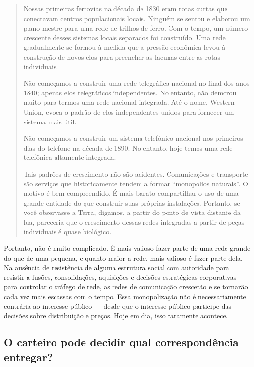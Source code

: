 \begin{quote}
Nossas primeiras ferrovias na década de 1830 eram rotas curtas que conectavam centros
populacionais locais. Ninguém se sentou e elaborou um plano mestre para uma rede de trilhos
de ferro. Com o tempo, um número crescente desses sistemas locais separados foi construído.
Uma rede gradualmente se formou à medida que a pressão econômica levou à construção de novos
elos para preencher as lacunas entre as rotas individuais.

Não começamos a construir uma rede telegráfica nacional no final dos anos 1840; apenas elos
telegráficos independentes. No entanto, não demorou muito para termos uma rede nacional
integrada. Até o nome, Western Union, evoca o padrão de elos independentes unidos para
fornecer um sistema mais útil.

Não começamos a construir um sistema telefônico nacional nos primeiros dias do telefone na
década de 1890. No entanto, hoje temos uma rede telefônica altamente integrada.

Tais padrões de crescimento não são acidentes. Comunicações e transporte são serviços que
historicamente tendem a formar ``monopólios naturais''. O motivo é bem compreendido. É mais
barato compartilhar o uso de uma grande entidade do que construir suas próprias instalações.
Portanto, se você observasse a Terra, digamos, a partir do ponto de vista distante da lua,
pareceria que o crescimento dessas redes integradas a partir de peças individuais é quase
biológico.
\end{quote}

Portanto, não é muito complicado. É mais valioso fazer parte de uma rede grande do que de
uma pequena, e quanto maior a rede, mais valioso é fazer parte dela. Na ausência de
resistência de alguma estrutura social com autoridade para resistir a fusões, consolidações,
aquisições e decisões estratégicas corporativas para controlar o tráfego de rede, as redes
de comunicação crescerão e se tornarão cada vez mais escassas com o tempo. Essa monopolização
não é necessariamente contrária ao interesse público --- desde que o interesse público
participe das decisões sobre distribuição e preços. Hoje em dia, isso raramente acontece.

\subsection{O carteiro pode decidir qual correspondência entregar?}
\label{gatekeepers:carteiro}

